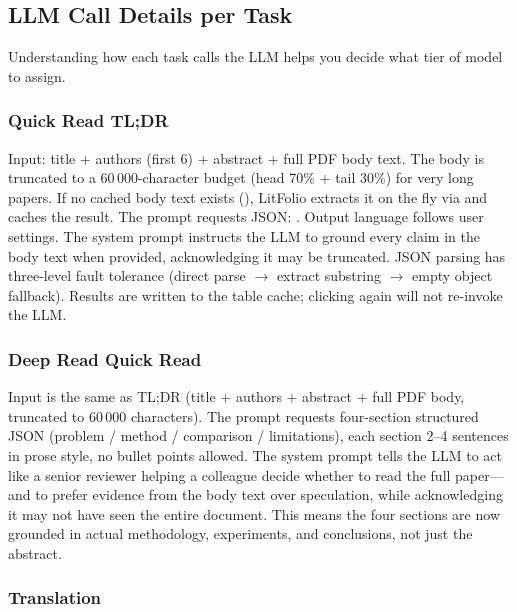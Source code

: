 \subsection{LLM Call Details per Task}

Understanding how each task calls the LLM helps you decide what tier of model to assign.

\subsubsection{Quick Read TL;DR}

Input: title + authors (first 6) + abstract + full PDF body text. The body is truncated
to a 60\,000-character budget (head 70\% + tail 30\%) for very long papers. If no cached
body text exists (), LitFolio extracts it on the fly via
 and caches the result. The prompt requests JSON: . Output language follows user settings. The system prompt instructs the LLM to
ground every claim in the body text when provided, acknowledging it may be truncated.
JSON parsing has three-level fault tolerance (direct parse $\rightarrow$ extract
 substring $\rightarrow$ empty object fallback). Results are written to the
 table cache; clicking again will not re-invoke the LLM.

\subsubsection{Deep Read Quick Read}

Input is the same as TL;DR (title + authors + abstract + full PDF body, truncated to
60\,000 characters). The prompt requests four-section structured JSON (problem / method
/ comparison / limitations), each section 2--4 sentences in prose style, no bullet points
allowed. The system prompt tells the LLM to act like a senior reviewer helping a colleague
decide whether to read the full paper---and to prefer evidence from the body text over
speculation, while acknowledging it may not have seen the entire document. This means
the four sections are now grounded in actual methodology, experiments, and conclusions,
not just the abstract.

\subsubsection{Translation}

